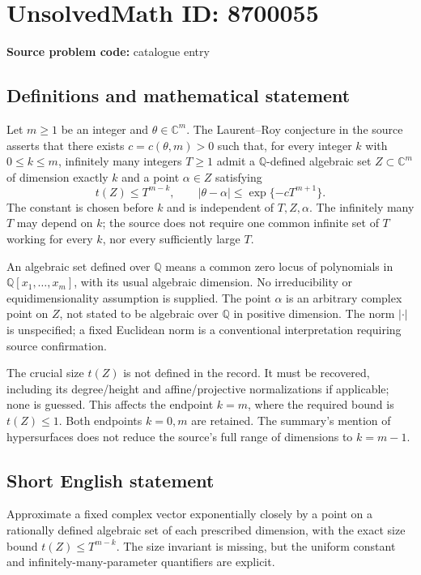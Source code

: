 \documentclass[11pt]{article}
\newcommand{\Q}{\mathbb{Q}}
\newcommand{\C}{\mathbb{C}}
\begin{document}
\section*{UnsolvedMath ID: 8700055}
\textbf{Source problem code:} catalogue entry
\subsection{Definitions and mathematical statement}
Let $m\geq1$ be an integer and $\theta\in\C^m$. The Laurent--Roy conjecture in the source asserts that there exists $c=c(\theta,m)>0$ such that, for every integer $k$ with $0\leq k\leq m$, infinitely many integers $T\geq1$ admit a $\Q$-defined algebraic set $Z\subset\C^m$ of dimension exactly $k$ and a point $\alpha\in Z$ satisfying
\[
t(Z)\leq T^{m-k},\qquad
|\theta-\alpha|\leq\exp\{-cT^{m+1}\}.
\]
The constant is chosen before $k$ and is independent of $T,Z,\alpha$. The infinitely many $T$ may depend on $k$; the source does not require one common infinite set of $T$ working for every $k$, nor every sufficiently large $T$.

An algebraic set defined over $\Q$ means a common zero locus of polynomials in $\Q[x_1,\ldots,x_m]$, with its usual algebraic dimension. No irreducibility or equidimensionality assumption is supplied. The point $\alpha$ is an arbitrary complex point on $Z$, not stated to be algebraic over $\Q$ in positive dimension. The norm $|\cdot|$ is unspecified; a fixed Euclidean norm is a conventional interpretation requiring source confirmation.

The crucial size $t(Z)$ is not defined in the record. It must be recovered, including its degree/height and affine/projective normalizations if applicable; none is guessed. This affects the endpoint $k=m$, where the required bound is $t(Z)\leq1$. Both endpoints $k=0,m$ are retained. The summary's mention of hypersurfaces does not reduce the source's full range of dimensions to $k=m-1$.
\subsection{Short English statement}
Approximate a fixed complex vector exponentially closely by a point on a rationally defined algebraic set of each prescribed dimension, with the exact size bound $t(Z)\leq T^{m-k}$. The size invariant is missing, but the uniform constant and infinitely-many-parameter quantifiers are explicit.
\end{document}
